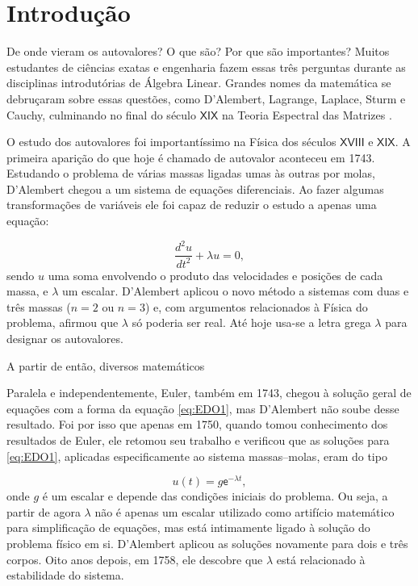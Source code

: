 \chapter{Introdução}
\label{cap:introducao}

\setcounter{page}{12}

	De onde vieram os autovalores? O que são? Por que são importantes? Muitos estudantes de ciências exatas e engenharia fazem essas três perguntas durante as disciplinas introdutórias de Álgebra Linear. Grandes nomes da matemática se debruçaram sobre essas questões, como D'Alembert, Lagrange, Laplace, Sturm e Cauchy, culminando no final do século $\mathsf{XIX}$ na Teoria Espectral das Matrizes \cite{Hawkins75}.
	
	O estudo dos autovalores foi importantíssimo na Física dos séculos $\mathsf{XVIII}$ e $\mathsf{XIX}$. A primeira aparição do que hoje é chamado de autovalor aconteceu em 1743. Estudando o problema de várias massas ligadas umas às outras por molas, D'Alembert chegou a um sistema de equações diferenciais. Ao fazer algumas transformações de variáveis ele foi capaz de reduzir o estudo a apenas uma equação:

\begin{equation}\label{eq:EDO1}
	\frac{d^2u}{dt^2} + \lambda u = 0,
\end{equation}
sendo $u$ uma soma envolvendo o produto das velocidades e posições de cada massa, e $\lambda$ um escalar. D'Alembert aplicou o novo método a sistemas com duas e três massas ($n = 2$ ou $n = 3$) e, com argumentos relacionados à Física do problema, afirmou que $\lambda$ só poderia ser real. Até hoje usa-se a letra grega $\lambda$ para designar os autovalores.

	A partir de então, diversos matemáticos
	
	Paralela e independentemente, Euler, também em 1743, chegou à solução geral de equações com a forma da equação \ref{eq:EDO1}, mas D'Alembert não soube desse resultado. Foi por isso que apenas em 1750, quando tomou conhecimento dos resultados de Euler, ele retomou seu trabalho e verificou que as soluções para \ref{eq:EDO1}, aplicadas especificamente ao sistema massas--molas, eram do tipo

\begin{equation}
	u(t) = g\mathsf{e}^{-\lambda t},
\end{equation}
onde $g$ é um escalar e depende das condições iniciais do problema. Ou seja, a partir de agora $\lambda$ não é apenas um escalar utilizado como artifício matemático para simplificação de equações, mas está intimamente ligado à solução do problema físico em si. D'Alembert aplicou as soluções novamente para dois e três corpos. Oito anos depois, em 1758, ele descobre que $\lambda$ está relacionado à estabilidade do sistema.

